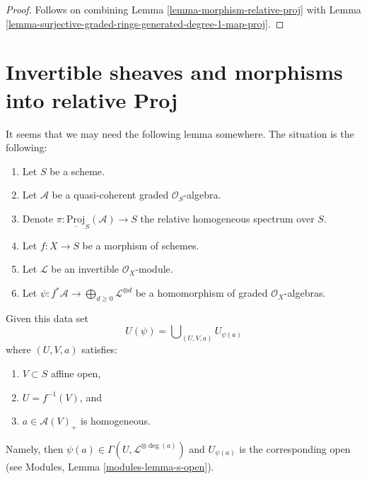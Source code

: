 \documentclass{stacks-project}
\theoremstyle{plain}
\theoremstyle{definition}
\theoremstyle{remark}
\numberwithin{equation}{subsection}
\begin{document}
\begin{proof}
Follows on combining
Lemma \ref{lemma-morphism-relative-proj}
with
Lemma \ref{lemma-surjective-graded-rings-generated-degree-1-map-proj}.
\end{proof}

















\section{Invertible sheaves and morphisms into relative Proj}
\label{section-invertible-relative-proj}

\noindent
It seems that we may need the following lemma somewhere.
The situation is the following:
\begin{enumerate}
\item Let $S$ be a scheme.
\item Let $\mathcal{A}$ be a quasi-coherent graded $\mathcal{O}_S$-algebra.
\item Denote $\pi : \underline{\text{Proj}}_S(\mathcal{A}) \to S$ the relative
homogeneous spectrum over $S$.
\item Let $f : X \to S$ be a morphism of schemes.
\item Let $\mathcal{L}$ be an invertible $\mathcal{O}_X$-module.
\item Let $\psi : f^*\mathcal{A} \to
\bigoplus_{d \geq 0} \mathcal{L}^{\otimes d}$
be a homomorphism of graded $\mathcal{O}_X$-algebras.
\end{enumerate}
Given this data set
$$
U(\psi) = \bigcup\nolimits_{(U, V, a)} U_{\psi(a)}
$$
where $(U, V, a)$ satisfies:
\begin{enumerate}
\item $V \subset S$ affine open,
\item $U = f^{-1}(V)$, and
\item $a \in \mathcal{A}(V)_{+}$ is homogeneous.
\end{enumerate}
Namely, then $\psi(a) \in \Gamma(U, \mathcal{L}^{\otimes \deg(a)})$
and $U_{\psi(a)}$ is the corresponding open (see
Modules, Lemma \ref{modules-lemma-s-open}).
\end{document}

